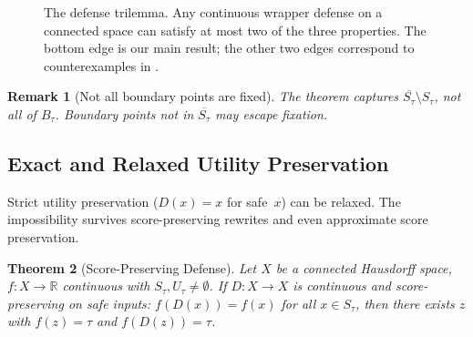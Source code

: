 \documentclass[11pt]{article}
\newtheorem{theorem}{Theorem}[section]
\newtheorem{remark}[theorem]{Remark}
\newcommand{\R}{\mathbb{R}}
\newcommand{\cl}[1]{\overline{#1}}
\begin{document}
\begin{figure}[t]
\centering
{}
\caption{The defense trilemma. Any continuous wrapper defense on a
connected space can satisfy at most two of
the three properties. The bottom edge is our main result; the other
two edges correspond to counterexamples in .}
\label{fig:trilemma}
\end{figure}

\begin{remark}[Not all boundary points are fixed]
The theorem captures $\cl{S_\tau} \setminus S_\tau$, not all of
$B_\tau$. Boundary points not in $\cl{S_\tau}$ may escape fixation.
\end{remark}


\subsection{Exact and Relaxed Utility Preservation}
\label{sec:relaxed}

Strict utility preservation ($D(x) = x$ for safe~$x$) can be
relaxed. The impossibility survives score-preserving rewrites and
even approximate score preservation.

\begin{theorem}[Score-Preserving Defense]
\label{thm:score-preserving}
Let $X$ be a connected Hausdorff space, $f\colon X\to\R$ continuous
with $S_\tau, U_\tau \neq \emptyset$. If $D\colon X \to X$ is
continuous and \emph{score-preserving on safe inputs}:
$f(D(x)) = f(x)$ for all $x \in S_\tau$, then there exists $z$ with
$f(z) = \tau$ and $f(D(z)) = \tau$.
\end{theorem}
\end{document}
